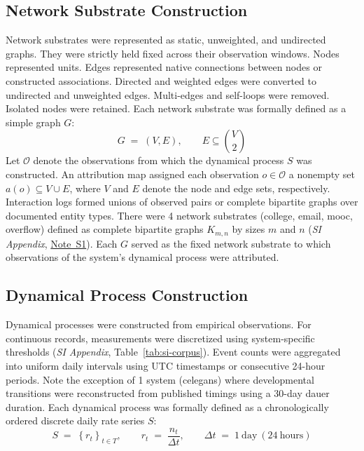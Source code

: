 \documentclass{article}
\begin{document}
\subsection*{Network Substrate Construction}
Network substrates were represented as static, unweighted, and undirected graphs. They were strictly held fixed across their observation windows. Nodes represented units. Edges represented native connections between nodes or constructed associations. Directed and weighted edges were converted to undirected and unweighted edges. Multi-edges and self-loops were removed. Isolated nodes were retained. Each network substrate was formally defined as a simple graph $G$:
\begin{equation}
    G \;=\; (V, E),
    \qquad
    E \subseteq \binom{V}{2}
\label{eq:graph}
\end{equation}
Let $\mathcal{O}$ denote the observations from which the dynamical process $S$ was constructed. An attribution map assigned each observation $o \in \mathcal{O}$ a nonempty set $a(o) \subseteq V \cup E$, where $V$ and $E$ denote the node and edge sets, respectively. Interaction logs formed unions of observed pairs or complete bipartite graphs over documented entity types. There were 4 network substrates (college, email, mooc, overflow) defined as complete bipartite graphs $K_{m,n}$ by sizes $m$ and $n$ (\textit{SI Appendix}, \hyperref[sec:si-note-bipartite]{Note~S1}). Each $G$ served as the fixed network substrate to which observations of the system's dynamical process were attributed.

\subsection*{Dynamical Process Construction}
Dynamical processes were constructed from empirical observations.
For continuous records, measurements were discretized using system-specific thresholds (\textit{SI Appendix}, Table~\ref{tab:si-corpus}). Event counts were aggregated into uniform daily intervals using UTC timestamps or consecutive 24-hour periods. Note the exception of 1 system (celegans) where developmental transitions were reconstructed from published timings using a 30-day dauer duration. Each dynamical process was formally defined as a chronologically ordered discrete daily rate series $S$:
\begin{equation}
    S \;=\; \left\{ r_{t} \right\}_{t \in T},
    \qquad
    r_{t} \;=\; \frac{n_{t}}{\Delta t},
    \qquad
    \Delta t \;=\; 1\ \mathrm{day}\ (24\ \mathrm{hours})
    \label{eq:series}
\end{equation}
\end{document}

